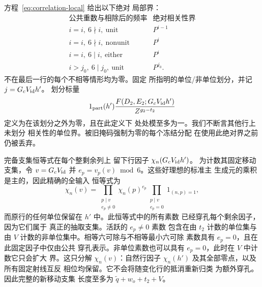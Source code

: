 \documentclass[11pt,a4paper]{article}
\numberwithin{equation}{section}
\numberwithin{figure}{section}
\theoremstyle{definition}
\theoremstyle{remark}
\begin{document}
方程~\eqref{eq:correlation-local} 给出以下绝对
局部界：
\[
 \begin{array}{c|c}
 \text{公共重数与相除后的频率}&
       \text{绝对相关性界}\\ \hline
 i=i,\ 6\nmid i,\ \text{unit}&P^{i-1}\\
 i=i,\ 6\nmid i,\ \text{nonunit}&P^i\\
 i=i,\ 6\mid i,\ \text{either}&P^i\\
 i>j_0,\ 6\mid j_0,\ \text{unit}&P^{j_0}.
 \end{array}
\]
不在最后一行的每个不相等情形均为零。固定
所指明的单位/非单位划分，并记 \(j=G_cV_{\rm id}h'\)。
划分标量
\[
 1_{\rm part}(h')
 \frac{F(D_2,E_2;G_cV_{\rm id}h')}{Z^{g_2-t_2}}
\]
定义为在该划分之外为零，且在此定义下
处处模至多为一。我们不断言其他行上未划分
相关性的单位界。被旧掩码强制为零的每个冻结分配
在使用此绝对界之前仍被丢弃。

完备支集恒等式在每个整剩余列上
留下行因子
\(\chi_n(G_cV_{\rm id}h')\)。
为计数其固定移动支集，令 \(v=G_cV_{\rm id}\) 并
\(e_p=v_p(v)\bmod 6\)。这些好理想的标准主
生成元的乘积是主的，因此精确的全输入
恒等式为
\[
 \chi_n(v)=
   \prod_{\substack{p\mid v\\e_p\ne0}}\chi_n(p)^{e_p}
   \prod_{\substack{p\mid v\\e_p=0}}1_{(n,p)=1},
\]
而原行的任何单位保留在 \(h'\) 中。此恒等式中的所有素数
已经穿孔每个剩余因子，因为它们属于
真正的抽取支集。活跃的 \(e_p\ne0\) 素数
包含在由 \(t_2\) 计数的单位集与由 \(V\)
计数的非单位集中。相等六可除与不相等最小六可除
素数具有 \(e_p=0\)，且在此固定因子中仅由公共
穿孔表示。非单位素数也可以具有
\(e_p=0\)，此时在 \(V\) 中计数它只会扩大
界。这只分解 \(\chi_n(v)\)：自然行因子
\(\chi_n(h')\) 及其全部零点，以及所有固定射线互反
相位均保留。它不会将随变化行的抵消重新归类
为额外穿孔。因此完整的新移动支集
长度至多为 \(\widetilde q+w_o+t_2+V\)。
\end{document}
